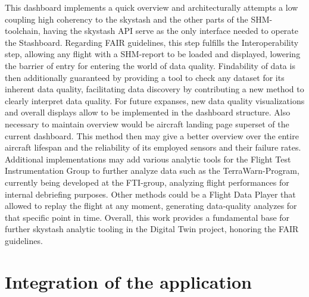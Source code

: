 This dashboard implements a quick overview and architecturally attempts a low coupling high coherency to the skystash and the other parts of the SHM-toolchain, having the skystash API serve as the only interface needed to operate the Stashboard.
Regarding FAIR guidelines, this step fulfills the Interoperability step, allowing any flight with a SHM-report to be loaded and displayed, lowering the barrier of entry for entering the world of data quality. Findability of data is then additionally guaranteed by providing a tool to check any dataset for its inherent data quality, facilitating data discovery by contributing a new method to clearly interpret data quality.
For future expanses, new data quality visualizations and overall displays allow to be implemented in the dashboard structure. Also necessary to maintain overview would be aircraft landing page superset of the current dashboard. This method then may give a better overview over the entire aircraft lifespan and the reliability of its employed sensors and their failure rates. Additional implementations may add various analytic tools for the Flight Test Instrumentation Group to further analyze data such as the TerraWarn-Program, currently being developed at the FTI-group, analyzing flight performances for internal debriefing purposes. Other methods could be a Flight Data Player that allowed to replay the flight at any moment, generating data-quality analyzes for that specific point in time. Overall, this work provides a fundamental base for further skystash analytic tooling in the Digital Twin project, honoring the FAIR guidelines.


\section{Integration of the application}

